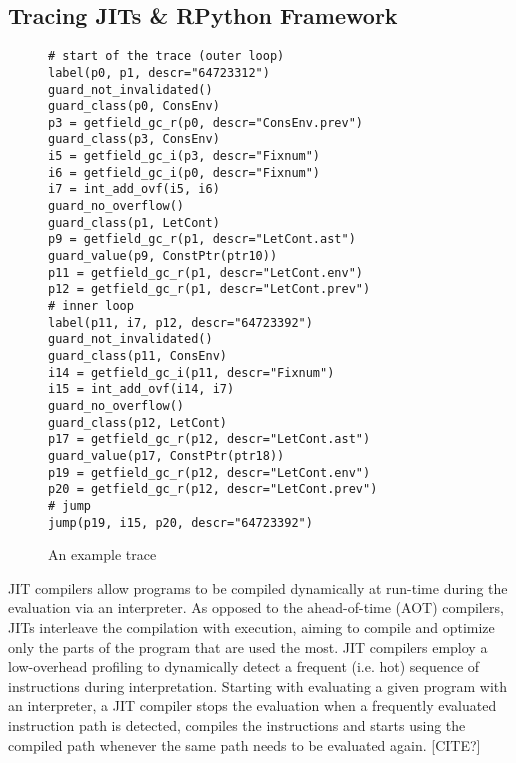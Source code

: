 \subsection{Tracing JITs \& RPython Framework}
\label{subsec:rpython}

  \begin{wrapfigure}[21]{r}{0.35\textwidth}
    \vspace{-0.8cm}
    \centering
    \begin{minipage}[t]{0.32\textwidth}
      \begin{verbatim}
# start of the trace (outer loop)
label(p0, p1, descr="64723312")
guard_not_invalidated()
guard_class(p0, ConsEnv)
p3 = getfield_gc_r(p0, descr="ConsEnv.prev")
guard_class(p3, ConsEnv)
i5 = getfield_gc_i(p3, descr="Fixnum")
i6 = getfield_gc_i(p0, descr="Fixnum")
i7 = int_add_ovf(i5, i6)
guard_no_overflow()
guard_class(p1, LetCont)
p9 = getfield_gc_r(p1, descr="LetCont.ast")
guard_value(p9, ConstPtr(ptr10))
p11 = getfield_gc_r(p1, descr="LetCont.env")
p12 = getfield_gc_r(p1, descr="LetCont.prev")
# inner loop
label(p11, i7, p12, descr="64723392")
guard_not_invalidated()
guard_class(p11, ConsEnv)
i14 = getfield_gc_i(p11, descr="Fixnum")
i15 = int_add_ovf(i14, i7)
guard_no_overflow()
guard_class(p12, LetCont)
p17 = getfield_gc_r(p12, descr="LetCont.ast")
guard_value(p17, ConstPtr(ptr18))
p19 = getfield_gc_r(p12, descr="LetCont.env")
p20 = getfield_gc_r(p12, descr="LetCont.prev")
# jump
jump(p19, i15, p20, descr="64723392")

    \end{verbatim}
    \end{minipage}
    \caption{\small An example trace}
    \label{fig:trace}
  \end{wrapfigure}

JIT compilers allow programs to be compiled dynamically at run-time
during the evaluation via an interpreter. As opposed to the
ahead-of-time (AOT) compilers, JITs interleave the compilation with
execution, aiming to compile and optimize only the parts of the
program that are used the most. JIT compilers employ a low-overhead
profiling to dynamically detect a frequent (i.e. hot) sequence of
instructions during interpretation. Starting with evaluating a given
program with an interpreter, a JIT compiler stops the evaluation when
a frequently evaluated instruction path is detected, compiles the
instructions and starts using the compiled path whenever the same path
needs to be evaluated again. [CITE?]


